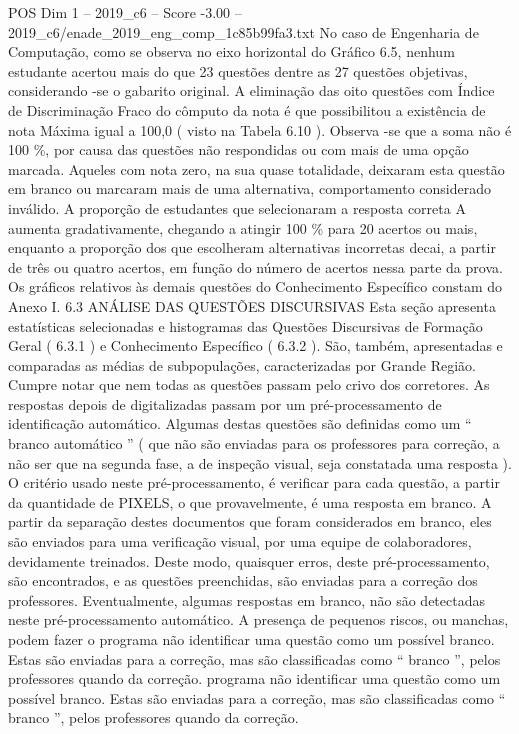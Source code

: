 \begin{textsample}{POS Dim 1 – 2019\_c6 – Score -3.00 – 2019\_c6/enade\_2019\_eng\_comp\_1c85b99fa3.txt}
No caso de Engenharia de Computação, como se observa no eixo horizontal do Gráfico 6.5, nenhum estudante acertou mais do que 23 questões dentre as 27 questões objetivas, considerando -se o gabarito original.
A eliminação das oito questões com Índice de Discriminação Fraco do cômputo da nota é que possibilitou a existência de nota Máxima igual a 100,0 ( visto na Tabela 6.10 ).
Observa -se que a soma não é 100 \%, por causa das questões não respondidas ou com mais de uma opção marcada.
Aqueles com nota zero, na sua quase totalidade, deixaram esta questão em branco ou marcaram mais de uma alternativa, comportamento considerado inválido.
A proporção de estudantes que selecionaram a resposta correta A aumenta gradativamente, chegando a atingir 100 \% para 20 acertos ou mais, enquanto a proporção dos que escolheram alternativas incorretas decai, a partir de três ou quatro acertos, em função do número de acertos nessa parte da prova.
Os gráficos relativos às demais questões do Conhecimento Específico constam do Anexo I. 6.3 ANÁLISE DAS QUESTÕES DISCURSIVAS Esta seção apresenta estatísticas selecionadas e histogramas das Questões Discursivas de Formação Geral ( 6.3.1 ) e Conhecimento Específico ( 6.3.2 ).
São, também, apresentadas e comparadas as médias de subpopulações, caracterizadas por Grande Região.
Cumpre notar que nem todas as questões passam pelo crivo dos corretores.
As respostas depois de digitalizadas passam por um pré-processamento de identificação automático.
Algumas destas questões são definidas como um “ branco automático ” ( que não são enviadas para os professores para correção, a não ser que na segunda fase, a de inspeção visual, seja constatada uma resposta ).
O critério usado neste pré-processamento, é verificar para cada questão, a partir da quantidade de PIXELS, o que provavelmente, é uma resposta em branco.
A partir da separação destes documentos que foram considerados em branco, eles são enviados para uma verificação visual, por uma equipe de colaboradores, devidamente treinados.
Deste modo, quaisquer erros, deste pré-processamento, são encontrados, e as questões preenchidas, são enviadas para a correção dos professores.
Eventualmente, algumas respostas em branco, não são detectadas neste pré-processamento automático.
A presença de pequenos riscos, ou manchas, podem fazer o programa não identificar uma questão como um possível branco.
Estas são enviadas para a correção, mas são classificadas como “ branco ”, pelos professores quando da correção. programa não identificar uma questão como um possível branco.
Estas são enviadas para a correção, mas são classificadas como “ branco ”, pelos professores quando da correção.

\end{textsample}
